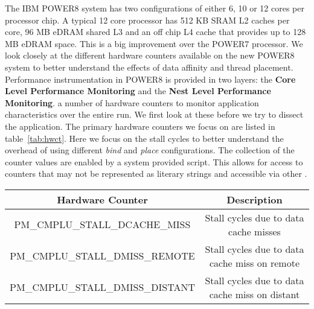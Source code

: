 The IBM POWER8 system has two configurations of either 6, 10 or 12 cores per processor chip. A typical 12 core processor has  512 KB SRAM L2 caches per core, 96 MB eDRAM shared L3 and an off chip L4 cache that provides up to 128 MB eDRAM space. This is a big improvement over the POWER7 processor. We look closely at the different hardware counters available on the new POWER8 system to better understand the effects of data affinity and thread placement. Performance instrumentation in POWER8 is provided in two layers: the \textbf{Core Level Performance Monitoring} and the \textbf{Nest Level Performance Monitoring}. a number of hardware counters to monitor application characteristics over the entire run. We first look at these before we try to dissect the application. The primary hardware counters we focus on are listed in table~\ref{tab:hwct}. Here we focus on the stall cycles to better understand the overhead of using different \textit{bind} and \textit{place} configurations. The collection of the counter values are enabled by a system provided script. This allows for access to counters that may not be represented as literary strings and accessible via other . 

\begin{table*}[t]
\vspace{-0.5pc}
\caption{POWER8 Relevant Counters}
\centering
\begin{tabular} { | c | c | }
\hline
{\bf Hardware Counter} & {\bf Description}  \\ \hline
PM\_CMPLU\_STALL\_DCACHE\_MISS & Stall cycles due to data cache misses	\\	\hline
PM\_CMPLU\_STALL\_DMISS\_REMOTE & Stall cycles due to data cache miss on remote \\	\hline
PM\_CMPLU\_STALL\_DMISS\_DISTANT & Stall cycles due to data cache miss on distant \\ \hline
\end{tabular}
\label{tab:hwct}
\end{table*}
